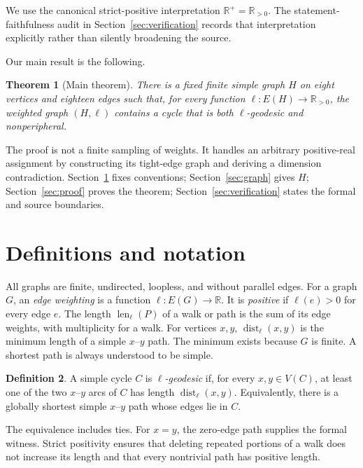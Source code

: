 \documentclass[11pt]{amsart}
\newtheorem{theorem}{Theorem}[section]
\theoremstyle{definition}
\newtheorem{definition}[theorem]{Definition}
\newcommand{\len}{\operatorname{len}}
\newcommand{\dist}{\operatorname{dist}}
\begin{document}
We use the canonical strict-positive interpretation $\mathbb R^+=\mathbb R_{>0}$.  The statement-faithfulness audit in Section~\ref{sec:verification} records that interpretation explicitly rather than silently broadening the source.

Our main result is the following.

\begin{theorem}[Main theorem]\label{thm:main}
There is a fixed finite simple graph $H$ on eight vertices and eighteen edges such that, for every function $\ell:E(H)\to\mathbb R_{>0}$, the weighted graph $(H,\ell)$ contains a cycle that is both $\ell$-geodesic and nonperipheral.
\end{theorem}

The proof is not a finite sampling of weights.  It handles an arbitrary positive-real assignment by constructing its tight-edge graph and deriving a dimension contradiction.  Section~\ref{sec:definitions} fixes conventions; Section~\ref{sec:graph} gives $H$; Section~\ref{sec:proof} proves the theorem; Section~\ref{sec:verification} states the formal and source boundaries.

\section{Definitions and notation}\label{sec:definitions}

All graphs are finite, undirected, loopless, and without parallel edges.  For a graph $G$, an \emph{edge weighting} is a function $\ell:E(G)\to\mathbb R$.  It is \emph{positive} if $\ell(e)>0$ for every edge $e$.  The length $\len_\ell(P)$ of a walk or path is the sum of its edge weights, with multiplicity for a walk.  For vertices $x,y$, $\dist_\ell(x,y)$ is the minimum length of a simple $x$--$y$ path.  The minimum exists because $G$ is finite.  A shortest path is always understood to be simple.

\begin{definition}\label{def:geodesic}
A simple cycle $C$ is \emph{$\ell$-geodesic} if, for every $x,y\in V(C)$, at least one of the two $x$--$y$ arcs of $C$ has length $\dist_\ell(x,y)$.  Equivalently, there is a globally shortest simple $x$--$y$ path whose edges lie in $C$.
\end{definition}

The equivalence includes ties.  For $x=y$, the zero-edge path supplies the formal witness.  Strict positivity ensures that deleting repeated portions of a walk does not increase its length and that every nontrivial path has positive length.
\end{document}
